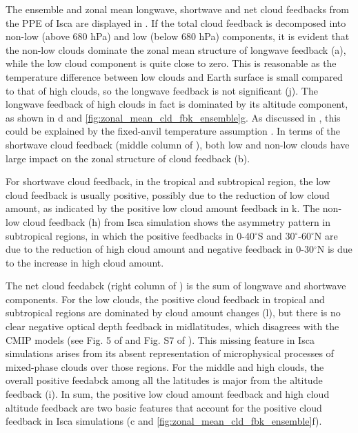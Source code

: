 The ensemble and zonal mean longwave, shortwave and net cloud feedbacks from the PPE of Isca are displayed in . If the total cloud feedback is decomposed into non-low (above 680 hPa) and low (below 680 hPa) components, it is evident that the non-low clouds dominate the zonal mean structure of longwave feedback (a), while the low cloud component is quite close to zero. This is reasonable as the temperature difference between low clouds and Earth surface is small compared to that of high clouds, so the longwave feedback is not significant (j). The longwave feedback of high clouds in fact is dominated by its altitude component, as shown in d and \ref{fig:zonal_mean_cld_fbk_ensemble}g. As discussed in , this could be explained by the fixed-anvil temperature assumption \citep{Hartmann2002FAT}. In terms of the shortwave cloud feedback (middle column of ), both low and non-low clouds have large impact on the zonal structure of cloud feedback (b). 

For shortwave cloud feedback, in the tropical and subtropical region, the low cloud feedback is usually positive, possibly due to the reduction of low cloud amount, as indicated by the positive low cloud amount feedback in k. The non-low cloud feedback (h) from Isca simulation shows the asymmetry pattern in subtropical regions, in which the positive feedbacks in 0-40$^\circ$S and 30$^\circ$-60$^\circ$N are due to the reduction of high cloud amount  and negative feedback in 0-30$^\circ$N is due to the increase in high cloud amount. 

The net cloud feedabck (right column of ) is the sum of longwave and shortwave components. For the low clouds, the positive cloud feedback in tropical and subtropical regions are dominated by cloud amount changes (l), but there is no clear negative optical depth feedback in midlatitudes, which disagrees with the CMIP models (see Fig. 5 of \citealt{Sherwood2020} and Fig. S7 of \citealt{Zelinka2016insights}). This missing feature in Isca simulations arises from its absent representation of microphysical processes of mixed-phase clouds over those regions. For the middle and high clouds, the overall positive feedabck among all the latitudes is major from the altitude feedback (i). In sum, the positive low cloud amount feedback and high cloud altitude feedback are two basic features that account for the positive cloud feedback in Isca simulations (c and \ref{fig:zonal_mean_cld_fbk_ensemble}f).

